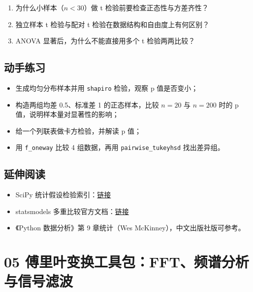 \begin{enumerate}
\def\labelenumi{\arabic{enumi}.}
\tightlist
\item
  为什么小样本（\(n<30\)）做 t 检验前要检查正态性与方差齐性？
\item
  独立样本 t 检验与配对 t 检验在数据结构和自由度上有何区别？
\item
  ANOVA 显著后，为什么不能直接用多个 t 检验两两比较？
\end{enumerate}

\subsection{动手练习}\label{ux52a8ux624bux7ec3ux4e60-3}

\begin{itemize}
\tightlist
\item
  生成均匀分布样本并用 \texttt{shapiro} 检验，观察 p 值是否变小；
\item
  构造两组均差 0.5、标准差 1 的正态样本，比较 \(n=20\) 与 \(n=200\) 时的
  p 值，说明样本量对显著性的影响；
\item
  给一个列联表做卡方检验，并解读 p 值；
\item
  用 \texttt{f\_oneway} 比较 4 组数据，再用 \texttt{pairwise\_tukeyhsd}
  找出差异组。
\end{itemize}

\subsection{延伸阅读}\label{ux5ef6ux4f38ux9605ux8bfb-13}

\begin{itemize}
\tightlist
\item
  SciPy
  统计假设检验索引：\href{https://docs.scipy.org/doc/scipy/reference/stats.html}{链接}
\item
  statsmodels
  多重比较官方文档：\href{https://www.statsmodels.org/stable/stats.html\#multiple-tests-and-multiple-comparisons}{链接}
\item
  《Python 数据分析》第 9 章统计（Wes McKinney），中文出版社版可参考。
\end{itemize}

\section{05
傅里叶变换工具包：FFT、频谱分析与信号滤波}\label{ux5085ux91ccux53f6ux53d8ux6362ux5de5ux5177ux5305fftux9891ux8c31ux5206ux6790ux4e0eux4fe1ux53f7ux6ee4ux6ce2}

